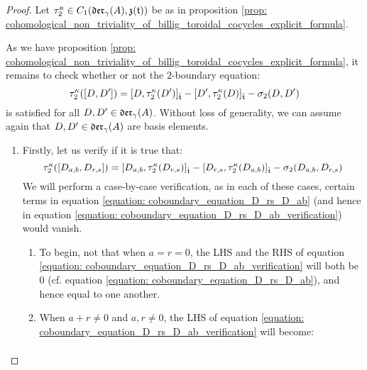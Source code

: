             \begin{proof}
                Let $\tau_2^{\kappa} \in C_1(\mathfrak{der}_{\gamma}(A), \mathfrak{z}(\mathfrak{t}))$ be as in proposition \ref{prop: cohomological_non_triviality_of_billig_toroidal_cocycles_explicit_formula}.
            
                As we have proposition \ref{prop: cohomological_non_triviality_of_billig_toroidal_cocycles_explicit_formula}, it remains to check whether or not the $2$-boundary equation:
                    \begin{equation} \label{equation: coboundary_verification_tau_2}
                        \tau_2^{\kappa}([D, D']) = [D, \tau_2^{\kappa}(D')]_{\hat{\mathfrak{t}}} - [D', \tau_2^{\kappa}(D)]_{\hat{\mathfrak{t}}} - \sigma_2(D, D')
                    \end{equation}
                is satisfied for all $D, D' \in \divzero$. Without loss of generality, we can assume again that $D, D' \in \divzero$ are basis elements.
                \begin{enumerate}
                    \item Firstly, let us verify if it is true that:
                        \begin{equation} \label{equation: coboundary_equation_D_rs_D_ab_verification}
                            \tau_2^{\kappa}([D_{a, b}, D_{r, s}]) = [D_{a, b}, \tau_2^{\kappa}(D_{r, s})]_{\hat{\mathfrak{t}}} - [D_{r, s}, \tau_2^{\kappa}(D_{a, b})]_{\hat{\mathfrak{t}}} - \sigma_2(D_{a, b}, D_{r, s})
                        \end{equation}
                    We will perform a case-by-case verification, as in each of these cases, certain terms in equation \eqref{equation: coboundary_equation_D_rs_D_ab} (and hence in equation \eqref{equation: coboundary_equation_D_rs_D_ab_verification}) would vanish.
                    \begin{enumerate}
                        \item To begin, not that when $a = r = 0$, the LHS and the RHS of equation \eqref{equation: coboundary_equation_D_rs_D_ab_verification} will both be $0$ (cf. equation \eqref{equation: coboundary_equation_D_rs_D_ab}), and hence equal to one another.
                        \item When $a + r \not = 0$ and $a, r \not = 0$, the LHS of equation \eqref{equation: coboundary_equation_D_rs_D_ab_verification} will become:
                            $$
                                \begin{aligned}

\end{aligned}$$
\end{enumerate}
\end{enumerate}
\end{proof}

